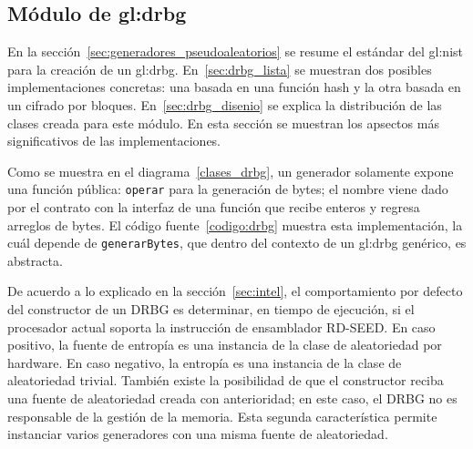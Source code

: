 %
%
%

\subsection{Módulo de \texorpdfstring{\acrshort{gl:drbg}}{DRBG}}
\label{sec:implementacion_drbg}

En la sección~\ref{sec:generadores_pseudoaleatorios} se resume el estándar del
\gls{gl:nist} para la  creación de un \gls{gl:drbg}. En~\ref{sec:drbg_lista} se
muestran dos posibles implementaciones concretas: una basada en una función
hash y la  otra basada en un cifrado por bloques. En~\ref{sec:drbg_disenio} se
explica la distribución de las clases creada para este módulo. En esta sección
se muestran los apsectos más significativos de las implementaciones.


Como se muestra en el diagrama~\ref{clases_drbg}, un generador solamente
expone una función pública: \texttt{operar} para la generación de bytes; el
nombre viene dado por el contrato con la interfaz de una función que
recibe enteros y regresa arreglos de bytes. El código fuente~\ref{codigo:drbg}
muestra esta implementación, la cuál depende de \texttt{generarBytes}, que
dentro del contexto de un \gls{gl:drbg} genérico, es abstracta.

De acuerdo a lo explicado en la sección~\ref{sec:intel}, el comportamiento por
defecto del constructor de un DRBG es determinar, en tiempo de ejecución, si el
procesador actual soporta la instrucción de ensamblador RD-SEED. En caso
positivo, la fuente de entropía es una instancia de la clase de aleatoriedad
por hardware. En caso negativo, la entropía es una instancia de la clase de
aleatoriedad trivial. También existe la posibilidad de que el constructor
reciba una fuente de aleatoriedad creada con anterioridad; en este caso, el
DRBG no es responsable de la gestión de la memoria. Esta segunda
característica permite instanciar varios generadores con una misma fuente de
aleatoriedad.



